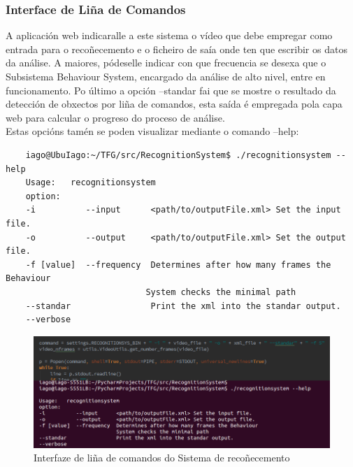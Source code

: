         \subsubsection{Interface de Liña de Comandos}
        A aplicación web indicaralle a este sistema o vídeo que debe empregar como entrada para o 
        recoñecemento e o ficheiro de saía onde ten que escribir os datos da análise. A maiores, pódeselle
        indicar con que frecuencia se desexa que o Subsistema Behaviour System, encargado da análise de
        alto nivel, entre en funcionamento. Po último a opción --standar fai que se mostre o resultado da
        detección de obxectos por liña de comandos, esta saída é empregada pola capa web para calcular o
        progreso do proceso de análise.\\
        
        Estas opcións tamén se poden visualizar mediante o comando --help:\\ 
        \begin{verbatim}
    iago@UbuIago:~/TFG/src/RecognitionSystem$ ./recognitionsystem --help
    Usage:   recognitionsystem
    option:  
    -i          --input      <path/to/outputFile.xml> Set the input file.
    -o          --output     <path/to/outputFile.xml> Set the output file.
    -f [value]  --frequency  Determines after how many frames the Behaviour 
                            System checks the minimal path
    --standar                Print the xml into the standar output.
    --verbose
        \end{verbatim}
        
        \begin{figure}[htp]
        \begin{center}
            \includegraphics[scale=0.45]{figures/InterfazLineaComandos.png}
            \caption{Interfaze de liña de comandos do Sistema de recoñecemento}
        \label{fig:InterfazLineaComandos}
        \end{center}
        \end{figure}
        
